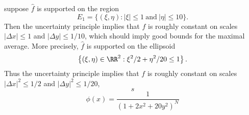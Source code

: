 suppose $\widehat{f}$ is supported on the region
%
\[ E_1 = \{ (\xi,\eta) : |\xi| \leq 1\ \text{and}\ |\eta| \leq 10 \}. \]
%
Then the uncertainty principle implies that $f$ is roughly constant on scales $|\Delta x| \leq 1$ and $|\Delta y| \leq 1/10$, which should imply good bounds for the maximal average. More precisely, $\widehat{f}$ is supported on the ellipsoid
%
\[ \left\{ (\xi,\eta) \in \RR^2 : \xi^2/2 + \eta^2/20 \leq 1 \right\}. \]
%
Thus the uncertainty principle implies that $f$ is roughly constant on scales $|\Delta x|^2 \leq 1/2$ and $|\Delta y|^2 \leq 1/20$,
%
\[ s \]
%
\[ \phi(x) = \frac{1}{( 1 + 2 x^2 + 20 y^2 )^N} \]